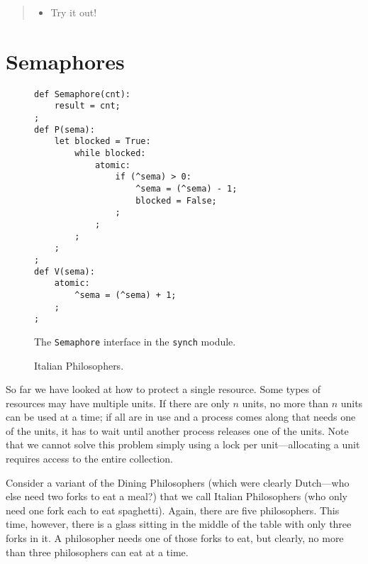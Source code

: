 \documentclass{report}
\newenvironment{code}{
\tcolorbox
}{
\endtcolorbox
}
\begin{document}
\begin{quote}
\begin{itemize}
\item Try it out!
\end{itemize}
\end{quote}

\chapter{Semaphores}

\begin{figure}
\begin{code}
\begin{verbatim}
def Semaphore(cnt):
    result = cnt;
;
def P(sema):
    let blocked = True:
        while blocked:
            atomic:
                if (^sema) > 0:
                    ^sema = (^sema) - 1;
                    blocked = False;
                ;
            ;
        ;
    ;
;
def V(sema):
    atomic:
        ^sema = (^sema) + 1;
    ;
;
\end{verbatim}
\end{code}
\caption{The \texttt{Semaphore} interface in the \texttt{synch} module.}
\label{fig:semaphore}
\end{figure}

\begin{figure}
\begin{code}
\end{code}
\caption{Italian Philosophers.}
\label{fig:dinerssema}
\end{figure}

So far we have looked at how to protect a single resource.
Some types of resources may have multiple units.
If there are only $n$ units, no more than $n$ units can be used at a time;
if all are in use and a process comes along that needs one of the units,
it has to wait until another process releases one of the units.
Note that we cannot solve this problem simply using a lock per unit---allocating
a unit requires access to the entire collection.

Consider a variant of the Dining Philosophers (which were clearly Dutch---who
else need two forks to eat a meal?) that we call Italian Philosophers (who only
need one fork each to eat spaghetti).  Again, there are five philosophers.
This time, however, there is a glass sitting in the middle of the table with only
three forks in it.  A philosopher needs one of those forks to eat, but clearly,
no more than three philosophers can eat at a time.
\end{document}
